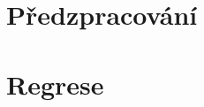 \documentclass[a4paper,12pt]{article}
\begin{document}



\section{Předzpracování}

\section{Regrese}




\FloatBarrier
\newpage
\end{document}
